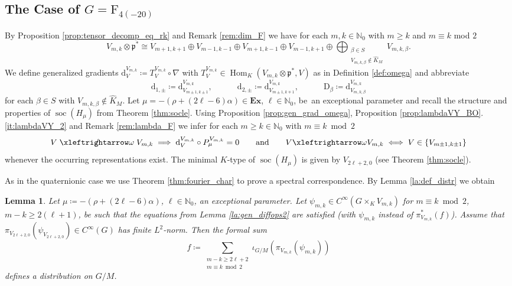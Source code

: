 \documentclass[JEP,XML,SOM,NoFloatCountersInSection,Unicode,published]{cedram}
\newtheorem{lemma}[theorem]{Lemma}
\theoremstyle{definition}
\newcommand{\lraomega}{\ensuremath{\xleftrightarrow\omega}}
\newcommand{\notleftrightomega}{\mathrel{\ooalign{$\xleftrightarrow\omega$\cr\hidewidth$/$\hidewidth}}}
\newcommand{\mf}[1]{\ensuremath{\mathfrak{#1}}}
\newcommand{\on}[1]{\ensuremath{\operatorname{#1}}}
\newcommand{\Hom}[3]{\ensuremath{\on{Hom}_{#1}(#2,#3)}}
\newcommand{\rhoa}{\ensuremath{\rho}}
\newcommand{\N}{\ensuremath{\mathbb{N}}}
\newcommand{\pst}[1]{\ensuremath{H_{#1}}}
\newcommand{\GF}{\ensuremath{\mathrm{F}_{4(-20)}}}
\begin{document}
\subsection{\texorpdfstring{The Case of $G=\GF$}{The Case of G=F4(-20)}}

By Proposition \ref{prop:tensor_decomp_eq_rk} and Remark \ref{rem:dim_F} we have for each $m,k\in\N_0$ with $m\geq k$ and $m\equiv k$ mod $2$
\[
V_{m,k}\otimes\mf p^*\cong V_{m+1,k+1}\oplus V_{m-1,k-1}\oplus V_{m+1,k-1}\oplus V_{m-1,k+1}\oplus\bigoplus_{\substack{\beta\in S\\V_{m,k,\beta}\not\in\hat K_M}} V_{m,k,\beta}.
\]
We define generalized gradients $\mathrm{d}_V^{V_{m,k}}\coloneqq T_V^{V_{m,k}}\circ\nabla$ with $T_V^{V_{m,k}}\in\Hom{K}{V_{m,k}\otimes\mf p^*}{V}$ as in Definition \ref{def:omega} and abbreviate
\[
\mathrm{d}_{1,\pm}\coloneqq\mathrm{d}_{V_{m\pm1,k\pm1}}^{V_{m,k}},\qquad\quad\mathrm{d}_{2,\pm}\coloneqq\mathrm{d}_{V_{m\pm1,k\mp1}}^{V_{m,k}},\qquad\quad\mathrm{D}_\beta\coloneqq\mathrm{d}_{V_{m,k,\beta}}^{V_{m,k}}
\]
for each $\beta\in S$ with $V_{m,k,\beta}\not\in\hat K_M$. Let $\mu=-(\rhoa+(2\ell-6)\alpha)\in\mathbf{Ex}$, $\ell\in\N_0$, be~an exceptional parameter and recall the structure and properties of $\on{soc}(\pst{\mu})$ from Theorem \ref{thm:socle}. Using Proposition \ref{prop:gen_grad_omega}, Proposition \ref{prop:lambdaVY_BO}.\ref{it:lambdaVY_2} and Remark \ref{rem:lambda_F} we infer for each $m\geq k\in\N_0$ with $m\equiv k\bmod2$
\[
V\notleftrightomega V_{m,k}\implies \mathrm{d}_V^{V_{m,k}}\circ P_\mu^{V_{m,k}}=0\qquad\text{and}\qquad V\lraomega V_{m,k}\iff V\in\{V_{m\pm1,k\pm1}\}
\]
whenever the occurring representations exist. The minimal $K$-type of $\on{soc}(\pst{\mu})$ is given by $V_{2\ell+2,0}$ (see Theorem \ref{thm:socle}).

As in the quaternionic case we use Theorem \ref{thm:fourier_char} to prove a spectral correspondence. By Lemma \ref{la:def_distr} we obtain
\begin{lemma}\label{la:poly_growth_F}
Let $\mu\coloneqq-(\rhoa+(2\ell-6)\alpha)$, $\ell\in\N_0$, an exceptional parameter. Let $\psi_{m,k}\in C^\infty(G\times_KV_{m,k})$ for $m\equiv k\bmod2$, $m-k\geq2(\ell+1)$, be such that the equations from Lemma \ref{la:gen_diffops2} are satisfied (with $\psi_{m,k}$ instead of $\pi_{V_{m,k}}^*(f)$). Assume that $\pi_{V_{2\ell+2,0}}(\psi_{V_{2\ell+2,0}})\in C^\infty(G)$ has finite $L^2$-norm.
Then the formal sum
\[
f\coloneqq\sum_{\substack{m-k\geq2\ell+2\\m\equiv k\bmod2}}\iota_{G/M}(\pi_{V_{m,k}}(\psi_{m,k}))
\]
defines a distribution on $G/M$.
\end{lemma}
\end{document}
